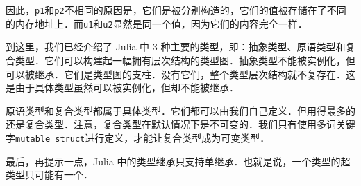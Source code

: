因此，\verb|p1|和\verb|p2|不相同的原因是，它们是被分别构造的，它们的值被存储在了不同的内存地址上．而\verb|u1|和\verb|u2|显然是同一个值，因为它们的内容完全一样．

到这里，我们已经介绍了 Julia 中 3 种主要的类型，即：抽象类型、原语类型和复合类型．它们可以构建起一幅拥有层次结构的类型图．抽象类型不能被实例化，但可以被继承．它们是类型图的支柱．没有它们，整个类型层次结构就不复存在．这是由于具体类型虽然可以被实例化，但却不能被继承．

原语类型和复合类型都属于具体类型．它们都可以由我们自己定义．但用得最多的还是复合类型．注意，复合类型在默认情况下是不可变的．我们只有使用多词关键字\verb|mutable struct|进行定义，才能让复合类型成为可变类型．

最后，再提示一点，Julia 中的类型继承只支持单继承．也就是说，一个类型的超类型只可能有一个．